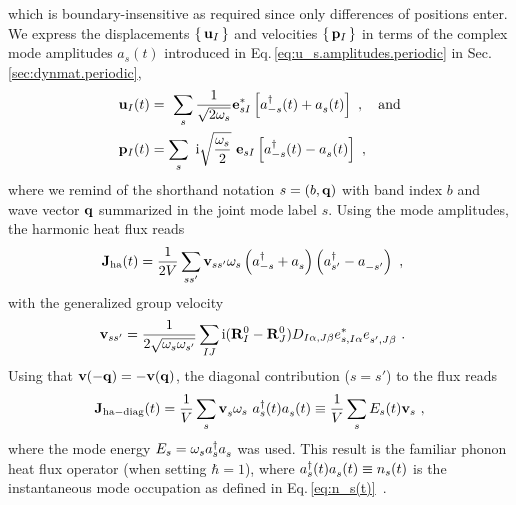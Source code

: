 which is boundary-insensitive as required since only differences of positions enter.
We express the displacements $\set {{\bf u}_I}$ and velocities $\set{{\bf p}_I}$ in terms of the complex mode amplitudes $a_s (t)$ introduced in Eq.\,\eqref{eq:u_s.amplitudes.periodic} in Sec.\,\ref{sec:dynmat.periodic},
\begin{align}
    \b u_I (t) 
	    &= ~\sum_s \frac{1}{\sqrt{2 \omega_s}} \b e^\ast_{s I} \left[ \D a_{-s} (t) + \fD a_s (t)\right]~,\quad\text{and} \\
	  \b p_I (t) 
		  &= \sum_s ~\im \sqrt{\frac{\omega_s}{2}} ~ {\b e}_{s I} \left[ \D a_{-s} (t) - \fD a_s (t) \right]~,
\end{align}
where we remind of the shorthand notation $s = (b, {\bf q})$ with band index $b$ and wave vector $\bf q$ summarized in the joint mode label $s$. Using the mode amplitudes, the harmonic heat flux reads
\begin{align}
    \b J_{\rm ha} (t) 
	    &= \frac{1}{2V} \sum_{ss'} \b v_{ss'} \omega_{s} \left( \D a_{-s} + \fD a_{s}  \right) \left( \D a_{s'} - \fD a_{-s'}  \right)~,
	  \label{eq:J.ha}
\end{align}
with the generalized group velocity
\begin{align}
	\b v_{ss'}
		&= \frac{1}{2 \sqrt{\omega_s \omega_{s'}}} \sum_{IJ} \im (\b R^0_I - \b R^0_J) D_{I \alpha, J \beta} e^\ast_{s, I \alpha} \fD e_{s', J \beta}~.
\end{align}
Using that ${\bf v} (- {\bf q}) = - {\bf v} ({\bf q})$, %
the diagonal contribution ($s=s'$) to the flux reads
\begin{align}
	\b J_{\rm ha-diag} (t) 
		= \frac{1}{V} \sum_{s} \fD {\b v}_{s} \omega_{s} ~ \D a_s (t) \fD a_s (t)
		\equiv \frac{1}{V} \sum_{s} E_s (t)  {\bf v}_{s}~,
	\label{eq:J.ha.diag}
\end{align}
where the mode energy $E_s = \omega_s \D a_s \fD a_s$ was used.
This result is the familiar phonon heat flux operator (when setting $\hbar = 1$), where $\D a_s (t) \fD a_s (t) \equiv n_s(t)$ is the instantaneous mode occupation as defined in Eq.\,\eqref{eq:n_s(t)}~\cite{Peierls1929,Hardy1963,Isaeva2019}.

